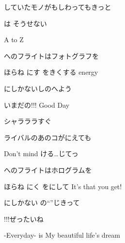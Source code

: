 \documentclass[14pt]{ltjsarticle}
\begin{document}
{\item
  していたモノがもしわってもきっと
  \jisho{}

  は そうせない
  \jisho{}

  
A to Z
  \jisho{}

\item
  へのフライトはフォトグラフを
  \jisho{}

  
ほらね にす をきくする energy
  \jisho{}

  にしかないしのへよう
  \jisho{}

  
いまだの!!! Good Day
  \jisho{}

  
シャラララすぐ
  \jisho{}

\item
  
ライバルのあのコがにえても
  \jisho{}

  
Don't mind ける…じてっ
  \jisho{}

\item
  へのフライトはホログラムを
  \jisho{}

  
ほらね にく をにして It's that you get!
  \jisho{}

  にしかない の``''じきって
  \jisho{}

  !!!ぜったいね
  \jisho{}

  
-Everyday- is My beautiful life's dream
  \jisho{}

}
\end{document}
